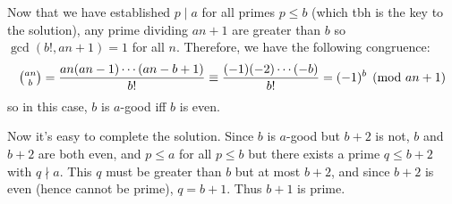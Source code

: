 \documentclass[11pt,a4paper]{article}
\begin{document}
\begin{enumerate}
	Now that we have established $p\mid a$ for all primes $p\le b$ (which tbh is the key to the solution), any prime dividing $an+1$ are greater than $b$ so $\gcd(b!, an+1)=1$ for all $n$. Therefore, we have the following congruence:
	$$
	\tbinom{an}{b}=\frac{an(an-1)\cdots (an-b+1)}{b!}\equiv\frac{(-1)(-2)\cdots (-b)}{b!}=(-1)^b\pmod{an+1}
	$$so in this case, $b$ is $a$-good iff $b$ is even.
	
	Now it's easy to complete the solution. Since $b$ is $a$-good but $b+2$ is not, $b$ and $b+2$ are both even, and $p\le a$ for all $p\le b$ but there exists a prime $q\le b+2$ with $q\nmid a$. This $q$ must be greater than $b$ but at most $b+2$, and since $b+2$ is even (hence cannot be prime), $q=b+1$. Thus $b+1$ is prime.
\end{enumerate}
\end{document}
